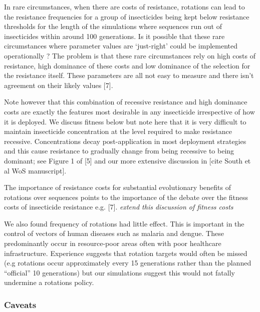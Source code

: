 \documentclass[11pt,]{article}
\begin{document}
In rare circumstances, when there are costs of resistance, rotations can
lead to the resistance frequencies for a group of insecticides being
kept below resistance thresholds for the length of the simulations where
sequences run out of insecticides within around 100 generations. Is it
possible that these rare circumstances where parameter values are
`just-right' could be implemented operationally ? The problem is that
these rare circumstances rely on high costs of resistance, high
dominance of these costs and low dominance of the selection for the
resistance itself. These parameters are all not easy to measure and
there isn't agreement on their likely values {[}7{]}.

Note however that this combination of recessive resistance and high
dominance costs are exactly the features most desirable in any
insecticide irrespective of how it is deployed. We discuss fitness below
but note here that it is very difficult to maintain insecticide
concentration at the level required to make resistance recessive.
Concentrations decay post-application in most deployment strategies and
this cause resistance to gradually change from being recessive to being
dominant; see Figure 1 of {[}5{]} and our more extensive discussion in
{[}cite South et al WoS manuscript{]}.

The importance of resistance costs for substantial evolutionary benefits
of rotations over sequences points to the importance of the debate over
the fitness costs of insecticide resistance e.g. {[}7{]}. \emph{extend
this discussion of fitness costs}

We also found frequency of rotations had little effect. This is
important in the control of vectors of human diseases such as malaria
and dengue. These predominantly occur in resource-poor areas often with
poor healthcare infrastructure. Experience suggests that rotation
targets would often be missed (e.g rotations occur approximately every
15 generations rather than the planned ``official'' 10 generations) but
our simulations suggest this would not fatally undermine a rotations
policy.

\subsubsection{Caveats}\label{caveats}
\end{document}
